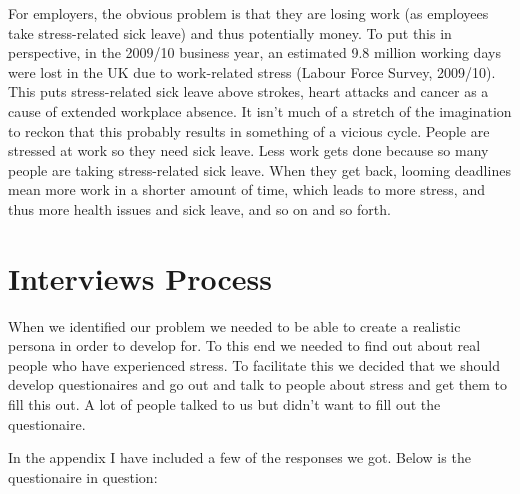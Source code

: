 \documentclass{scrartcl}
\begin{document}
For employers, the obvious problem is that they are losing work (as employees take stress-related sick leave) and thus
potentially money. To put this in perspective, in the 2009/10 business year, an estimated 9.8 million working days
were lost in the UK due to work-related stress (Labour Force Survey, 2009/10).
This puts stress-related sick leave above strokes, heart attacks and
cancer as a cause of extended workplace absence. It isn't much of a stretch of the imagination to reckon that this
probably results in something of a vicious cycle. People are stressed at work so they need sick leave. Less work gets
done because so many people are taking stress-related sick leave. When they get back, looming deadlines mean more work
in a shorter amount of time, which leads to more stress, and thus more health issues and sick leave, and so on and so forth.

\section{Interviews Process}
When we identified our problem we needed to be able to create a realistic persona
in order to develop for. To this end we needed to find out about real people
who have experienced stress. To facilitate this we decided that we should
develop questionaires and go out and talk to people about stress and get them to 
fill this out. A lot of people talked to us but didn't want to fill out the 
questionaire.

In the appendix I have included a few of the responses we got. Below is the 
questionaire in question:

\end{document}
